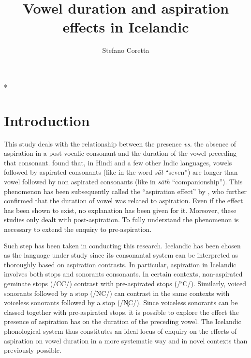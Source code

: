 \documentclass[11pt,a4paper,openany]{memoir}\usepackage[]{graphicx}\usepackage[]{color}
\title{Vowel duration and aspiration effects in Icelandic}
\author{Stefano Coretta}
\begin{document}
\frontmatter


\begin{titlingpage}
\maketitle
\end{titlingpage}

*
\setcounter{page}{3}

\tableofcontents*
\newpage
\listoftables*
\newpage
\listoffigures*




\mainmatter
\setcounter{page}{9}


\chapter{Introduction}
\label{c:introduction}

This study deals with the relationship between the presence \textit{vs.} the absence of aspiration in a post-vocalic consonant and the duration of the vowel preceding that consonant.
\citet{maddieson1976,maddieson1976a} found that, in Hindi and a few other Indic languages, vowels followed by aspirated consonants (like in the word \textit{sāt} ``seven'') are longer than vowel followed by non aspirated consonants (like in \textit{sāth} ``companionship'').
This phenomenon has been subsequently called the ``aspiration effect'' by \citet{durvasula2012}, who further confirmed that the duration of vowel was related to aspiration.
Even if the effect has been shown to exist, no explanation has been given for it.
Moreover, these studies only dealt with post-aspiration.
To fully understand the phenomenon is necessary to extend the enquiry to pre-aspiration.

Such step has been taken in conducting this research.
Icelandic has been chosen as the language under study since its consonantal system can be interpreted as thoroughly based on aspiration contrasts.
In particular, aspiration in Icelandic involves both stops and sonorants consonants.
In certain contexts, non-aspirated geminate stops (/CC/) contrast with pre-aspirated stops (/ʰC/).
Similarly, voiced sonorants followed by a stop (/NC/) can contrast in the same contexts with voiceless sonorants followed by a stop (/N̥C/).
Since voiceless sonorants can be classed together with pre-aspirated stops, it is possible to explore the effect the presence of aspiration has on the duration of the preceding vowel.
The Icelandic phonological system thus constitutes an ideal locus of enquiry on the effects of aspiration on vowel duration in a more systematic way and in novel contexts than previously possible.
\end{document}
